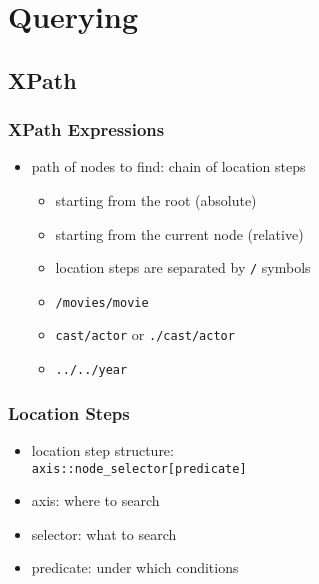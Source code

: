 \documentclass[dvipsnames]{beamer}
\theoremstyle{plain}
\begin{document}
\section{Querying}

\subsection{XPath}

\begin{frame}
  \frametitle{XPath Expressions}

  \begin{itemize}
    \item path of nodes to find: chain of location steps
    \begin{itemize}
      \item starting from the root (absolute)
      \item starting from the current node (relative)

      \medskip
      \item location steps are separated by \lstinline!/! symbols
    \end{itemize}

    \pause
    \begin{example}
      \begin{itemize}
       \item \lstinline!/movies/movie!
       \item \lstinline!cast/actor! or \lstinline!./cast/actor!
       \item \lstinline!../../year!
      \end{itemize}
    \end{example}
  \end{itemize}
\end{frame}

\begin{frame}
  \frametitle{Location Steps}

  \begin{itemize}
    \item location step structure:\\
      \lstinline!axis::node_selector[predicate]!

    \pause
    \medskip
    \item axis: where to search
    \item selector: what to search
    \item predicate: under which conditions
  \end{itemize}
\end{frame}
\end{document}
